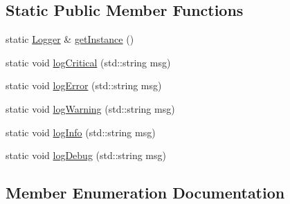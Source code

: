 \subsection*{Static Public Member Functions}
\begin{DoxyCompactItemize}
\item 
static \hyperlink{class_logger}{Logger} \& \hyperlink{class_logger_acebb37f5538780e6c14f13de6ec497bc}{get\+Instance} ()
\item 
static void \hyperlink{class_logger_a1e371911c3a930af5959cfe4de3a0e25}{log\+Critical} (std\+::string msg)
\item 
static void \hyperlink{class_logger_ada4ef25d16123b5367a70c9fa0ef0fd7}{log\+Error} (std\+::string msg)
\item 
static void \hyperlink{class_logger_a0835527c3b67be24326a8447856d84a6}{log\+Warning} (std\+::string msg)
\item 
static void \hyperlink{class_logger_a4fe03aa253188ef739b5dec5e036f640}{log\+Info} (std\+::string msg)
\item 
static void \hyperlink{class_logger_ad8278460637697892593e6ef633d54a4}{log\+Debug} (std\+::string msg)
\end{DoxyCompactItemize}


\subsection{Member Enumeration Documentation}
